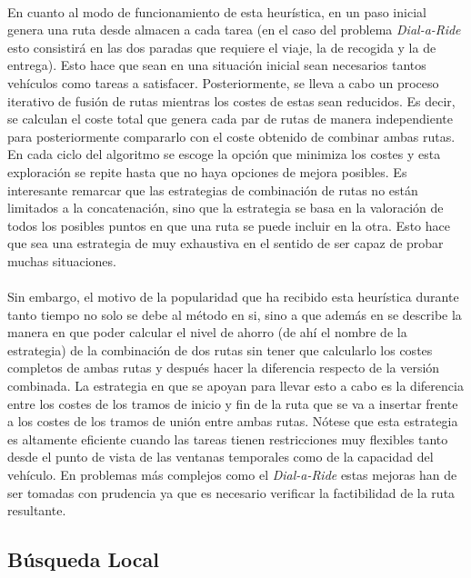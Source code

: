 \documentclass{subfiles}
\begin{document}
        \paragraph{}
        En cuanto al modo de funcionamiento de esta heurística, en un paso inicial genera una ruta desde almacen a cada tarea (en el caso del problema \emph{Dial-a-Ride} esto consistirá en las dos paradas que requiere el viaje, la de recogida y la de entrega). Esto hace que sean en una situación inicial sean necesarios tantos vehículos como tareas a satisfacer. Posteriormente, se lleva a cabo un proceso iterativo de fusión de rutas mientras los costes de estas sean reducidos. Es decir, se calculan el coste total que genera cada par de rutas de manera independiente para posteriormente compararlo con el coste obtenido de combinar ambas rutas. En cada ciclo del algoritmo se escoge la opción que minimiza los costes y esta exploración se repite hasta que no haya opciones de mejora posibles. Es interesante remarcar que las estrategias de combinación de rutas no están limitados a la concatenación, sino que la estrategia se basa en la valoración de todos los posibles puntos en que una ruta se puede incluir en la otra. Esto hace que sea una estrategia de muy exhaustiva en el sentido de ser capaz de probar muchas situaciones.

        \paragraph{}
        Sin embargo, el motivo de la popularidad que ha recibido esta heurística durante tanto tiempo no solo se debe al método en si, sino a que además en \cite{clarke1964scheduling} se describe la manera en que poder calcular el nivel de ahorro (de ahí el nombre de la estrategia) de la combinación de dos rutas sin tener que calcularlo los costes completos de ambas rutas y después hacer la diferencia respecto de la versión combinada. La estrategia en que se apoyan para llevar esto a cabo es la diferencia entre los costes de los tramos de inicio y fin de la ruta que se va a insertar frente a los costes de los tramos de unión entre ambas rutas. Nótese que esta estrategia es altamente eficiente cuando las tareas tienen restricciones muy flexibles tanto desde el punto de vista de las ventanas temporales como de la capacidad del vehículo. En problemas más complejos como el \emph{Dial-a-Ride} estas mejoras han de ser tomadas con prudencia ya que es necesario verificar la factibilidad de la ruta resultante.

      \subsection{Búsqueda Local}
      \label{sec:solving_local_search}
\end{document}
